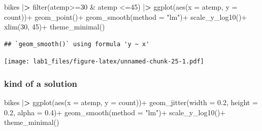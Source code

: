 \documentclass[
]{article}
\newenvironment{Shaded}{\begin{snugshade}}{\end{snugshade}}
\newcommand{\AttributeTok}[1]{\textcolor[rgb]{0.77,0.63,0.00}{#1}}
\newcommand{\DecValTok}[1]{\textcolor[rgb]{0.00,0.00,0.81}{#1}}
\newcommand{\ErrorTok}[1]{\textcolor[rgb]{0.64,0.00,0.00}{\textbf{#1}}}
\newcommand{\FloatTok}[1]{\textcolor[rgb]{0.00,0.00,0.81}{#1}}
\newcommand{\FunctionTok}[1]{\textcolor[rgb]{0.00,0.00,0.00}{#1}}
\newcommand{\NormalTok}[1]{#1}
\newcommand{\SpecialCharTok}[1]{\textcolor[rgb]{0.00,0.00,0.00}{#1}}
\newcommand{\StringTok}[1]{\textcolor[rgb]{0.31,0.60,0.02}{#1}}
\begin{document}
\begin{Shaded}
\begin{Highlighting}[]
\NormalTok{bikes }\SpecialCharTok{|}\ErrorTok{\textgreater{}} 
  \FunctionTok{filter}\NormalTok{(atemp}\SpecialCharTok{\textgreater{}=}\DecValTok{30} \SpecialCharTok{\&}\NormalTok{ atemp }\SpecialCharTok{\textless{}=}\DecValTok{45}\NormalTok{) }\SpecialCharTok{|}\ErrorTok{\textgreater{}} 
  \FunctionTok{ggplot}\NormalTok{(}\FunctionTok{aes}\NormalTok{(}\AttributeTok{x =}\NormalTok{ atemp, }\AttributeTok{y =}\NormalTok{ count))}\SpecialCharTok{+}
  \FunctionTok{geom\_point}\NormalTok{()}\SpecialCharTok{+}
  \FunctionTok{geom\_smooth}\NormalTok{(}\AttributeTok{method =} \StringTok{"lm"}\NormalTok{)}\SpecialCharTok{+}
    \FunctionTok{scale\_y\_log10}\NormalTok{()}\SpecialCharTok{+}
  \FunctionTok{xlim}\NormalTok{(}\DecValTok{30}\NormalTok{, }\DecValTok{45}\NormalTok{)}\SpecialCharTok{+}
  \FunctionTok{theme\_minimal}\NormalTok{()}
\end{Highlighting}
\end{Shaded}

\begin{verbatim}
## `geom_smooth()` using formula 'y ~ x'
\end{verbatim}

\texttt{[image: lab1\_files/figure-latex/unnamed-chunk-25-1.pdf]}

\hypertarget{kind-of-a-solution}{%
\subsubsection{kind of a solution}\label{kind-of-a-solution}}

\begin{Shaded}
\begin{Highlighting}[]
\NormalTok{bikes }\SpecialCharTok{|}\ErrorTok{\textgreater{}} 
  \FunctionTok{ggplot}\NormalTok{(}\FunctionTok{aes}\NormalTok{(}\AttributeTok{x =}\NormalTok{ atemp, }\AttributeTok{y =}\NormalTok{ count))}\SpecialCharTok{+}
  \FunctionTok{geom\_jitter}\NormalTok{(}\AttributeTok{width =} \FloatTok{0.2}\NormalTok{, }\AttributeTok{height =} \FloatTok{0.2}\NormalTok{, }\AttributeTok{alpha =} \FloatTok{0.4}\NormalTok{)}\SpecialCharTok{+}
  \FunctionTok{geom\_smooth}\NormalTok{(}\AttributeTok{method =} \StringTok{"lm"}\NormalTok{)}\SpecialCharTok{+}
  \FunctionTok{scale\_y\_log10}\NormalTok{()}\SpecialCharTok{+}
  \FunctionTok{theme\_minimal}\NormalTok{()}
\end{Highlighting}
\end{Shaded}
\end{document}
